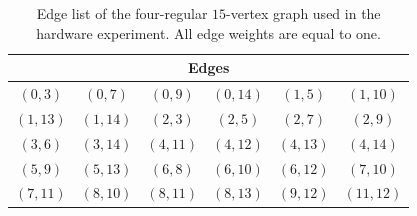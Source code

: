 \begin{table}[H]
\centering
\caption{Edge list of the four-regular $15$-vertex graph used in the hardware experiment. All edge weights are equal to one.}
\label{tab:hardware_edge_list}
\begin{tabular}{cccccc}
\toprule
\multicolumn{6}{c}{Edges} \\
\midrule
$(0,3)$ & $(0,7)$ & $(0,9)$ & $(0,14)$ & $(1,5)$ & $(1,10)$ \\
$(1,13)$ & $(1,14)$ & $(2,3)$ & $(2,5)$ & $(2,7)$ & $(2,9)$ \\
$(3,6)$ & $(3,14)$ & $(4,11)$ & $(4,12)$ & $(4,13)$ & $(4,14)$ \\
$(5,9)$ & $(5,13)$ & $(6,8)$ & $(6,10)$ & $(6,12)$ & $(7,10)$ \\
$(7,11)$ & $(8,10)$ & $(8,11)$ & $(8,13)$ & $(9,12)$ & $(11,12)$ \\
\bottomrule
\end{tabular}
\end{table}
